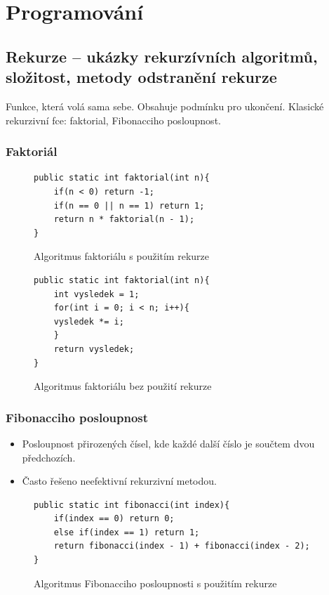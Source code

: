 \documentclass[10pt,a4paper]{article}
\begin{document}
\newpage
\section{Programování}
\subsection{Rekurze – ukázky rekurzívních algoritmů, složitost, metody odstranění rekurze}
Funkce, která volá sama sebe. Obsahuje podmínku pro ukončení. Klasické rekurzivní fce: faktorial, Fibonacciho posloupnost.
\subsubsection{Faktoriál}
\begin{figure}[ht]
\centering
\begin{lstlisting}
public static int faktorial(int n){
    if(n < 0) return -1;
    if(n == 0 || n == 1) return 1;
    return n * faktorial(n - 1);
}
\end{lstlisting}
\caption{Algoritmus faktoriálu s použitím rekurze}
\label{src:fakRek}
\end{figure}

\begin{figure}[ht]
\centering
\begin{lstlisting}
public static int faktorial(int n){
    int vysledek = 1;
    for(int i = 0; i < n; i++){
    vysledek *= i;
    }
    return vysledek;
}
\end{lstlisting}
    \caption{Algoritmus faktoriálu bez použití rekurze}
    \label{src:fakBezRek}
\end{figure}


\subsubsection{Fibonacciho posloupnost}
\begin{itemize}
\item Posloupnost přirozených čísel, kde každé další číslo je součtem dvou předchozích.
\item Často řešeno neefektivní rekurzivní metodou.
\end{itemize}

\begin{figure}[ht]
\centering
\begin{lstlisting}
public static int fibonacci(int index){
    if(index == 0) return 0;
    else if(index == 1) return 1;
    return fibonacci(index - 1) + fibonacci(index - 2);
}
\end{lstlisting}
    \caption{Algoritmus Fibonacciho posloupnosti s použitím rekurze}
    \label{src:fibonacciRekurze}
\end{figure}
\end{document}
